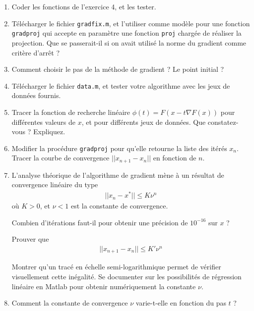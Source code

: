 \documentclass[10pt,a4paper,fleqn]{report}
\begin{document}
\begin{enumerate}
\item Coder les fonctions de l'exercice 4, et les tester.
\item Télécharger le fichier \verb+gradfix.m+, et l'utiliser comme
  modèle pour une fonction \verb+gradproj+ qui accepte en paramètre
  une fonction \verb+proj+ chargée de réaliser la projection. Que se
  passerait-il si on avait utilisé la norme du gradient comme critère
  d'arrêt ?
\item Comment choisir le pas de la méthode de gradient ? Le point
  initial ?
\item Télécharger le fichier \verb+data.m+, et tester votre algorithme
  avec les jeux de données fournis.
\item Tracer la fonction de recherche linéaire $\phi(t) = F(x-t\nabla
  F(x))$ pour différentes valeurs de $x$, et pour différents jeux de
  données. Que constatez-vous ? Expliquez.
\item Modifier la procédure \verb+gradproj+ pour qu'elle retourne la
  liste des itérés $x_{n}$. Tracer la courbe de convergence $||x_{n+1}
  - x_{n}||$ en fonction de $n$.
\item L'analyse théorique de l'algorithme de gradient mène à un
  résultat de convergence linéaire du type
  \begin{align*}
    ||x_{n} - x^{*}|| \leq K \nu^{n}
  \end{align*}
  où $K > 0$, et $\nu < 1$ est la constante de convergence.

  Combien d'itérations faut-il pour obtenir une précision de
  $10^{-16}$ sur $x$ ?
  
  Prouver que
  \begin{align*}
    ||x_{n+1} - x_{n}|| \leq K' \nu^{n}
  \end{align*}

  Montrer qu'un tracé en échelle semi-logarithmique permet de vérifier
  visuellement cette inégalité. Se documenter sur les possibilités de
  régression linéaire en Matlab pour obtenir numériquement la
  constante $\nu$.
\item Comment la constante de convergence $\nu$ varie-t-elle en
  fonction du pas $t$ ?
\end{enumerate}
\end{document}
